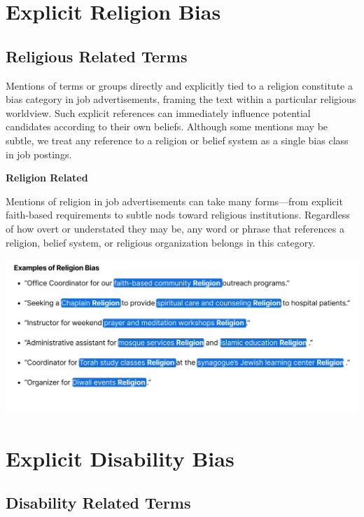 \documentclass[
]{book}
\begin{document}
\section{Explicit Religion Bias}\label{explicit-religion-bias}

\subsection*{Religious Related Terms}\label{religion-bias}

Mentions of terms or groups directly and explicitly tied to a religion constitute a bias category in job advertisements, framing the text within a particular religious worldview. Such explicit references can immediately influence potential candidates according to their own beliefs. Although some mentions may be subtle, we treat any reference to a religion or belief system as a single bias class in job postings.

{\textbf{Religion Related}}

Mentions of religion in job advertisements can take many forms---from explicit faith-based requirements to subtle nods toward religious institutions. Regardless of how overt or understated they may be, any word or phrase that references a religion, belief system, or religious organization belongs in this category.

\includegraphics{images/Religion-Related.png}

\section{Explicit Disability Bias}\label{explicit-disability-bias}

\subsection*{Disability Related Terms}\label{disability-bias}
\end{document}
